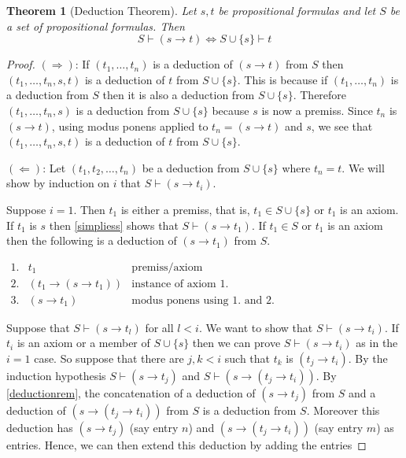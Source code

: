 \documentclass[11pt]{article}
\newtheorem{theorem}{Theorem}[section]
\begin{document}
\begin{theorem}[Deduction Theorem]
Let $s,t$ be propositional formulas and let $S$ be a set of propositional formulas. Then
\[S\vdash(s\rightarrow t) \iff S\cup\{s\}\vdash t\]
\end{theorem}
\begin{proof}
$(\Rightarrow)$: If $(t_1,\ldots,t_n)$ is a deduction of $(s\rightarrow t)$ from $S$ then $(t_1,\ldots,t_n,s,t)$ is a deduction of $t$ from $S\cup \{s\}$. This is because if $(t_1,\ldots, t_n)$ is a deduction from $S$ then it is also a deduction from $S\cup\{s\}$. Therefore $(t_1,\ldots,t_n,s)$ is a deduction from $S\cup \{s\}$ because $s$ is now a premiss. Since $t_n$ is $(s\rightarrow t)$, using modus ponens applied to $t_n=(s\rightarrow t)$ and $s$, we see that $(t_1,\ldots,t_n,s,t)$ is a deduction of $t$ from $S\cup \{s\}$.

\noindent
$(\Leftarrow)$: Let $(t_1,t_2,\ldots,t_n)$ be a deduction from $S\cup\{s\}$ where $t_n=t$. We will show by induction on $i$ that $S\vdash (s\rightarrow t_i)$.

Suppose $i=1$. Then $t_1$ is either a premiss, that is, $t_1\in S\cup\{s\}$ or $t_1$ is an axiom. If $t_1$ is $s$ then \ref{simpliess} shows that $S\vdash (s\rightarrow t_1)$. If $t_1\in S$ or $t_1$ is an axiom then the following is a deduction of $(s\rightarrow t_1)$ from $S$.

\bigskip
$
\begin{array}{rcl}
  1. & t_1 & \text{premiss/axiom} \\
  2. & (t_1\rightarrow (s\rightarrow t_1)) & \text{instance of axiom 1.} \\
  3. & (s\rightarrow t_1) & \text{modus ponens using $1.$ and $2.$}
\end{array}
$
\bigskip

Suppose that $S\vdash (s\rightarrow t_l)$ for all $l<i$. We want to show that $S\vdash (s\rightarrow t_{i})$. If $t_{i}$ is an axiom or a member of $S\cup\{s\}$ then we can prove $S\vdash (s\rightarrow t_{i})$ as in the $i=1$ case. So suppose that there are $j,k<i$ such that $t_k$ is $(t_j\rightarrow t_{i})$.  By the induction hypothesis $S\vdash (s\rightarrow t_j)$ and $S\vdash (s\rightarrow(t_j\rightarrow t_{i}))$. By \ref{deductionrem}, the concatenation of a deduction of $(s\rightarrow t_j)$ from  $S$ and a deduction of $(s\rightarrow(t_j\rightarrow t_{i}))$ from $S$ is a deduction from $S$. Moreover this deduction has $(s\rightarrow t_j)$ (say entry $n$) and  $(s\rightarrow(t_j\rightarrow t_{i}))$ (say entry $m$) as entries. Hence, we can then extend this deduction by adding the entries


\end{proof}
\end{document}
